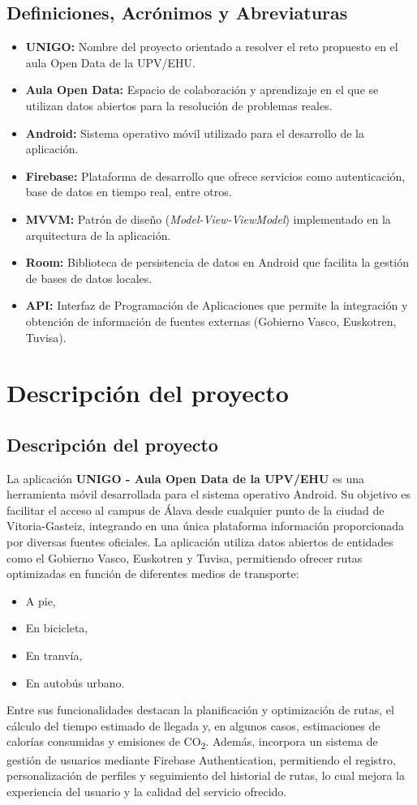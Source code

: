 \documentclass[a4paper,12pt]{report}
\begin{document}
    \section{Definiciones, Acrónimos y Abreviaturas}
      \begin{itemize}
        \item \textbf{UNIGO:} Nombre del proyecto orientado a resolver el reto propuesto en el aula Open Data de la UPV/EHU.
        \item \textbf{Aula Open Data:} Espacio de colaboración y aprendizaje en el que se utilizan datos abiertos para la resolución de problemas reales.
        \item \textbf{Android:} Sistema operativo móvil utilizado para el desarrollo de la aplicación.
        \item \textbf{Firebase:} Plataforma de desarrollo que ofrece servicios como autenticación, base de datos en tiempo real, entre otros.
        \item \textbf{MVVM:} Patrón de diseño (\textit{Model-View-ViewModel}) implementado en la arquitectura de la aplicación.
        \item \textbf{Room:} Biblioteca de persistencia de datos en Android que facilita la gestión de bases de datos locales.
        \item \textbf{API:} Interfaz de Programación de Aplicaciones que permite la integración y obtención de información de fuentes externas (Gobierno Vasco, Euskotren, Tuvisa).
      \end{itemize}
    \chapter{Descripción del proyecto}
      \section{Descripción del proyecto}
        La aplicación \textbf{UNIGO - Aula Open Data de la UPV/EHU} es una herramienta móvil desarrollada para el sistema operativo Android. Su objetivo es facilitar el acceso al campus de Álava desde cualquier punto de la ciudad de Vitoria-Gasteiz, integrando en una única plataforma información proporcionada por diversas fuentes oficiales. La aplicación utiliza datos abiertos de entidades como el Gobierno Vasco, Euskotren y Tuvisa, permitiendo ofrecer rutas optimizadas en función de diferentes medios de transporte:
        \begin{itemize}
          \item A pie,
          \item En bicicleta,
          \item En tranvía,
          \item En autobús urbano.
        \end{itemize}
        Entre sus funcionalidades destacan la planificación y optimización de rutas, el cálculo del tiempo estimado de llegada y, en algunos casos, estimaciones de calorías consumidas y emisiones de CO\textsubscript{2}. Además, incorpora un sistema de gestión de usuarios mediante Firebase Authentication, permitiendo el registro, personalización de perfiles y seguimiento del historial de rutas, lo cual mejora la experiencia del usuario y la calidad del servicio ofrecido.
\end{document}
